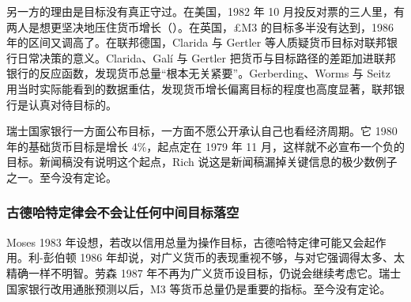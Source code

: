 另一方的理由是目标没有真正守过。在美国，1982 年 10 月投反对票的三人里，有两人是想更坚决地压住货币增长（）\cite{fomc1982b}。在英国，£M3 的目标多半没有达到，1986 年的区间又调高了\cite{leighpemberton1986,hansard1986}。在联邦德国，Clarida 与 Gertler 等人质疑货币目标对联邦银行日常决策的意义\cite{gerberding2004}。Clarida、Galí 与 Gertler 把货币与目标路径的差距加进联邦银行的反应函数，发现货币总量“根本无关紧要”\cite{gerberding2004}。Gerberding、Worms 与 Seitz 用当时实际能看到的数据重估，发现货币增长偏离目标的程度也高度显著，联邦银行是认真对待目标的\cite{gerberding2004}。

瑞士国家银行一方面公布目标，一方面不愿公开承认自己也看经济周期\cite{rich2003}。它 1980 年的基础货币目标是增长 4\%，起点定在 1979 年 11 月，这样就不必宣布一个负的目标\cite{rich2003}。新闻稿没有说明这个起点，Rich 说这是新闻稿漏掉关键信息的极少数例子之一\cite{rich2003}。至今没有定论。

\subsubsection{古德哈特定律会不会让任何中间目标落空}

Moses 1983 年设想，若改以信用总量为操作目标，古德哈特定律可能又会起作用\cite{moses1983}。利-彭伯顿 1986 年却说，对广义货币的表现重视不够，与对它强调得太多、太精确一样不明智\cite{leighpemberton1986}。劳森 1987 年不再为广义货币设目标，仍说会继续考虑它\cite{hansard1987}。瑞士国家银行改用通胀预测以后，M3 等货币总量仍是重要的指标\cite{rich2003}。至今没有定论。

